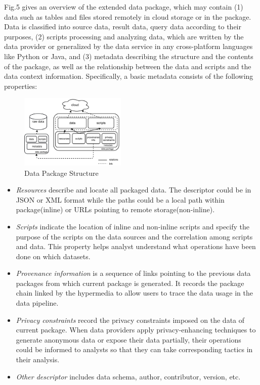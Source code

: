 \documentclass[10pt, conference, compsocconf]{IEEEtran}
\begin{document}
Fig.5 gives an overview of the extended data package, which may contain (1) data such as tables and files stored remotely in cloud storage or in the package. Data is classified into source data, result data, query data according to their purposes, (2) scripts processing and analyzing data, which are written by the data provider or generalized by the data service in any cross-platform languages like Python or Java, and (3) metadata describing the structure and the contents of the package, as well as the relationship between the data and scripts and the data context information. Specifically, a basic metadata consists of the following properties: 
\begin{figure}[th]
	\centering
	\includegraphics[width=0.45\textwidth]{dataPackageStructure.pdf}
	\caption{Data Package Structure}
	\label{fig.5}
\end{figure}
\begin{itemize}
	\item \textit{Resources} describe and locate all packaged data. The descriptor could be in JSON or XML format while the paths could be a local path within package(inline) or URLs pointing to remote storage(non-inline). 
	\item \textit{Scripts} indicate the location of inline and non-inline scripts and specify the purpose of the scripts on the data sources and the correlation among scripts and data. This property helps analyst understand what operations have been done on which datasets.
	\item \textit{Provenance information} is a sequence of links pointing to the previous data packages from which current package is generated. It records the package chain linked by the hypermedia to allow users to trace the data usage in the data pipeline. 
	\item \textit{Privacy constraints} record the privacy constraints imposed on the data of current package. When data providers apply privacy-enhancing techniques to generate anonymous data or expose their data partially, their operations could be informed to analysts so that they can take corresponding tactics in their analysis.
	\item \textit{Other descriptor} includes data schema, author, contributor, version, etc. 
\end{itemize}	
\end{document}
